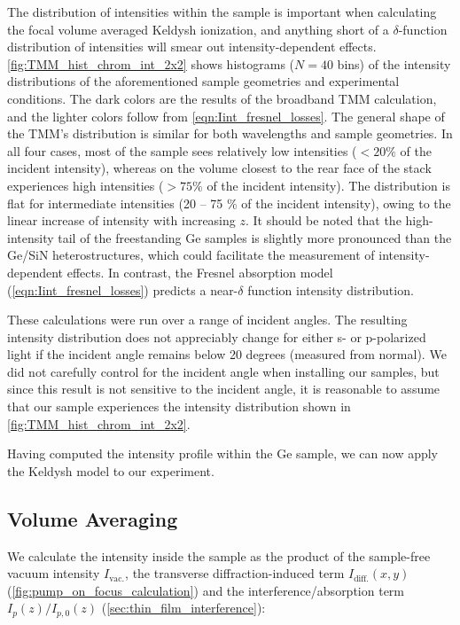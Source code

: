 The distribution of intensities within the sample is important when calculating the focal volume averaged Keldysh ionization, and anything short of a $\delta$-function distribution of intensities will smear out intensity-dependent effects. \cref{fig:TMM_hist_chrom_int_2x2} shows histograms ($N = 40$ bins) of the intensity distributions of the aforementioned sample geometries and experimental conditions. The dark colors are the results of the broadband TMM calculation, and the lighter colors follow from \cref{eqn:Iint_fresnel_losses}. The general shape of the TMM's distribution is similar for both wavelengths and sample geometries. In all four cases, most of the sample sees relatively low intensities ($<20\%$ of the incident intensity), whereas on the volume closest to the rear face of the stack experiences high intensities ($>75\%$ of the incident intensity). The distribution is flat for intermediate intensities ({20 -- 75 \%} of the incident intensity), owing to the linear increase of intensity with increasing $z$. It should be noted that the high-intensity tail of the freestanding Ge samples is slightly more pronounced than the Ge/SiN heterostructures, which could facilitate the measurement of intensity-dependent effects. In contrast, the Fresnel absorption model (\cref{eqn:Iint_fresnel_losses}) predicts a near-$\delta$ function intensity distribution.

These calculations were run over a range of incident angles. The resulting intensity distribution does not appreciably change for either s- or p-polarized light if the incident angle remains below 20 degrees (measured from normal). We did not carefully control for the incident angle when installing our samples, but since this result is not sensitive to the incident angle, it is reasonable to assume that our sample experiences the intensity distribution shown in \cref{fig:TMM_hist_chrom_int_2x2}.

Having computed the intensity profile within the Ge sample, we can now apply the Keldysh model to our experiment.

\subsection{Volume Averaging}
\label{sec:volume_averaging}

We calculate the intensity inside the sample as the product of the sample-free vacuum intensity $I_{\textrm{vac.}}$, the transverse diffraction-induced term $I_{\textrm{diff.}}(x, y)$ (\cref{fig:pump_on_focus_calculation}) and the interference/absorption term $I_p(z) / I_{p,0}(z)$ (\cref{sec:thin_film_interference}):

